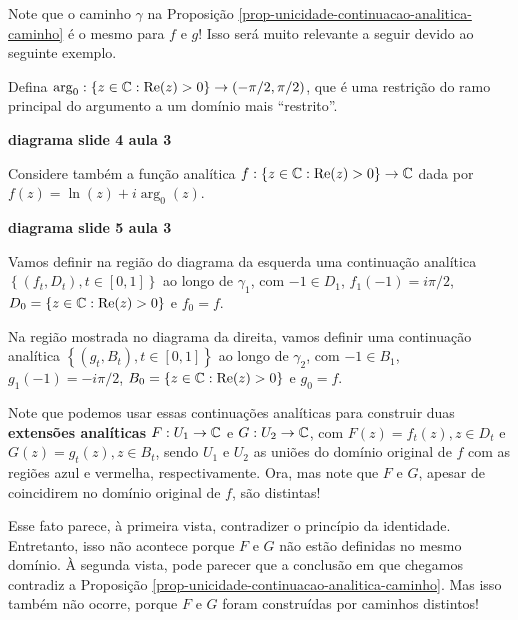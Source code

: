     \begin{observacao}
        Note que o caminho $\gamma$ na 
        Proposição \ref{prop-unicidade-continuacao-analitica-caminho} é o
        mesmo para $f$ e $g$! Isso será muito relevante a seguir devido ao 
        seguinte exemplo.
        
        Defina $\arg_0: \left\{ z\in\mathbb{C} : \mathrm{Re}(z) > 0 \right\} \to (-\pi/2, \pi/2)$,
        que é uma restrição do ramo principal do argumento a um domínio mais ``restrito''.
        \begin{center}
            \textbf{diagrama slide 4 aula 3}
        \end{center}
        Considere também a função analítica 
        $f: \left\{ z\in\mathbb{C} : \mathrm{Re}(z) > 0 \right\} \to\mathbb{C}$
        dada por $f(z) = \ln(z) + i\arg_0(z)$.
        \begin{center}
            \textbf{diagrama slide 5 aula 3}
        \end{center}
        Vamos definir na região do diagrama da esquerda uma continuação analítica
        $\left\{ (f_t, D_t), t\in [0,1] \right\}$ ao longo de $\gamma_1$, 
        com $-1\in D_1$, $f_1(-1) = i\pi/2$,
        $D_0 = \left\{ z\in\mathbb{C} : \mathrm{Re}(z) > 0 \right\}$ e $f_0 = f$.
        
        Na região mostrada no diagrama da direita, vamos definir uma continuação analítica
        $\left\{ (g_t, B_t), t\in [0,1] \right\}$ ao longo de $\gamma_2$,
        com $-1\in B_1$, $g_1(-1) = -i\pi/2$, 
        $B_0 = \left\{ z\in\mathbb{C} : \mathrm{Re}(z) > 0 \right\}$ e $g_0 = f$.
        
        Note que podemos usar essas continuações analíticas para construir duas
        \textbf{extensões analíticas} $F:U_1\to\mathbb{C}$ e $G:U_2\to\mathbb{C}$, 
        com $F(z) = f_t(z), z\in D_t$ e $G(z) = g_t(z), z\in B_t$, 
        sendo $U_1$ e $U_2$ as uniões do domínio original de $f$
        com as regiões azul e vermelha, respectivamente. Ora, mas note que
        $F$ e $G$, apesar de coincidirem no domínio original de $f$, são distintas!
        
        Esse fato parece, à primeira vista, contradizer o princípio da identidade. 
        Entretanto, isso não acontece porque $F$ e $G$ não estão definidas no mesmo
        domínio. À segunda vista, pode parecer que a conclusão em que chegamos contradiz
        a Proposição \ref{prop-unicidade-continuacao-analitica-caminho}. Mas isso também 
        não ocorre, porque $F$ e $G$ foram construídas por caminhos distintos!
    \end{observacao}


